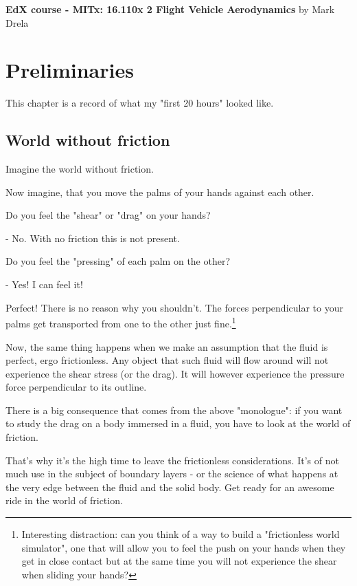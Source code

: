 \documentclass[12pt]{report}
\begin{document}
\textbf{EdX course - MITx: 16.110x 2 Flight Vehicle Aerodynamics} by Mark Drela










\chapter{Preliminaries}

This chapter is a record of what my "first 20 hours" looked like.


\section{World without friction} \label{chap:without_friction}

Imagine the world without friction.

Now imagine, that you move the palms of your hands against each other.

Do you feel the "shear" or "drag" on your hands?

- No. With no friction this is not present.

Do you feel the "pressing" of each palm on the other?

- Yes! I can feel it!

Perfect! There is no reason why you shouldn't. The forces perpendicular to your palms get transported from one to the other just fine.\footnote{Interesting distraction: can you think of a way to build a "frictionless world simulator", one that will allow you to feel the push on your hands when they get in close contact but at the same time you will not experience the shear when sliding your hands?}

Now, the same thing happens when we make an assumption that the fluid is perfect, ergo frictionless. Any object that such fluid will flow around will not experience the shear stress (or the drag). It will however experience the pressure force perpendicular to its outline.

There is a big consequence that comes from the above "monologue": if you want to study the drag on a body immersed in a fluid, you have to look at the world of friction.

That's why it's the high time to leave the frictionless considerations. It's of not much use in the subject of boundary layers - or the science of what happens at the very edge between the fluid and the solid body. Get ready for an awesome ride in the world of friction.
\end{document}
